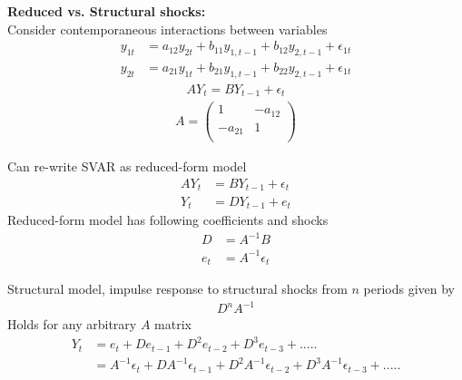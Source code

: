 \documentclass{beamer}
\begin{document}
\begin{frame}
  \textbf{Reduced vs. Structural shocks:}\\
  Consider contemporaneous interactions between variables
\begin{align}
  y_{1t} &= a_{12}y_{2t} + b_{11}y_{1,t-1} + b_{12}y_{2,t-1} +\epsilon_{1t}\\ \nonumber
  y_{2t} &= a_{21}y_{1t} + b_{21}y_{1,t-1} + b_{22}y_{2,t-1} +\epsilon_{1t}
\end{align}
  \begin{align}  
    AY_t = BY_{t-1} + \epsilon_t 
  \end{align}
  \begin{align}
   A= \begin{pmatrix}
      1 & -a_{12}\\ -a_{21} & 1 \\
    \end{pmatrix}
  \end{align}
\end{frame}

\begin{frame}
  Can re-write SVAR as reduced-form model
  \begin{align}
  AY_t &= BY_{t-1} + \epsilon_t \\
    Y_t&= DY_{t-1} + e_t
  \end{align}
  \medskip
  Reduced-form model has following coefficients and shocks
\begin{align}
  D &= A^{-1}B \\
  e_t &= A^{-1} \epsilon_t   
\end{align}
\end{frame}

\begin{frame}
  Structural model, impulse response to structural shocks from $n$ periods given by
  \begin{align}
    D^nA^{-1}
  \end{align}
  \medskip
  Holds for any arbitrary $A$ matrix
  \begin{align}
  Y_t&= e_t + De_{t-1} + D^2e_{t-2} + D^3e_{t-3} + .....\\ \nonumber
     &= A^{-1}\epsilon_t + DA^{-1}\epsilon_{t-1} + D^2A^{-1}\epsilon_{t-2} + D^3A^{-1}\epsilon_{t-3} + ..... \end{align}
\end{frame}
\end{document}
